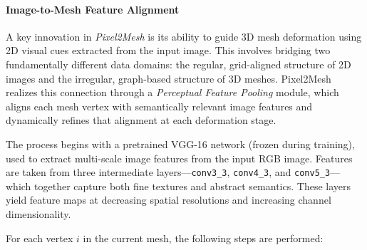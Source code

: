 \paragraph{Image-to-Mesh Feature Alignment}

A key innovation in \emph{Pixel2Mesh} is its ability to guide 3D mesh deformation using 2D visual cues extracted from the input image. This involves bridging two fundamentally different data domains: the regular, grid-aligned structure of 2D images and the irregular, graph-based structure of 3D meshes. Pixel2Mesh realizes this connection through a \emph{Perceptual Feature Pooling} module, which aligns each mesh vertex with semantically relevant image features and dynamically refines that alignment at each deformation stage.

The process begins with a pretrained VGG-16 network (frozen during training), used to extract multi-scale image features from the input RGB image. Features are taken from three intermediate layers—\texttt{conv3\_3}, \texttt{conv4\_3}, and \texttt{conv5\_3}—which together capture both fine textures and abstract semantics. These layers yield feature maps at decreasing spatial resolutions and increasing channel dimensionality.

For each vertex \( i \) in the current mesh, the following steps are performed:

